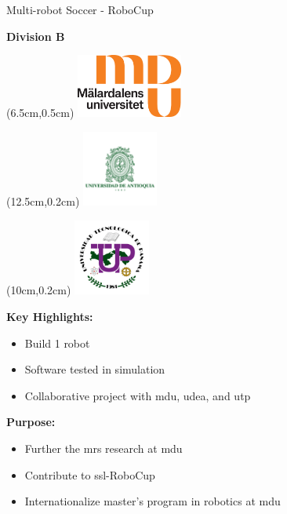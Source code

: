 
\begin{frame}{Multi-robot Soccer - RoboCup}

    \textbf{Division B}
  
    \begin{textblock*}{3cm}(6.5cm,0.5cm) %
        \centering
        \includegraphics[width=3.5cm]{image/__logo.eps} \\
    \end{textblock*}
  
    \begin{textblock*}{3cm}(12.5cm,0.2cm) %
        \centering
        \includegraphics[width=2.5cm]{image/png/UDEA.png} \\
    \end{textblock*}

    \begin{textblock*}{3cm}(10cm,0.2cm) %
        \centering
        \includegraphics[width=2.5cm]{image/png/UTP.png} \\
    \end{textblock*}

    \textbf{Key Highlights:}
    \begin{itemize}
        \item Build 1 robot
        \item Software tested in simulation
        \item Collaborative project with \ac{mdu}, \ac{udea}, and \ac{utp}
    \end{itemize}

    \textbf{Purpose:}
    \begin{itemize}
        \item Further the \acf{mrs} research at \ac{mdu} 
        \item Contribute to \ac{ssl}-RoboCup 
        \item Internationalize master's program in robotics at \ac{mdu}
    \end{itemize}
  
\end{frame}

